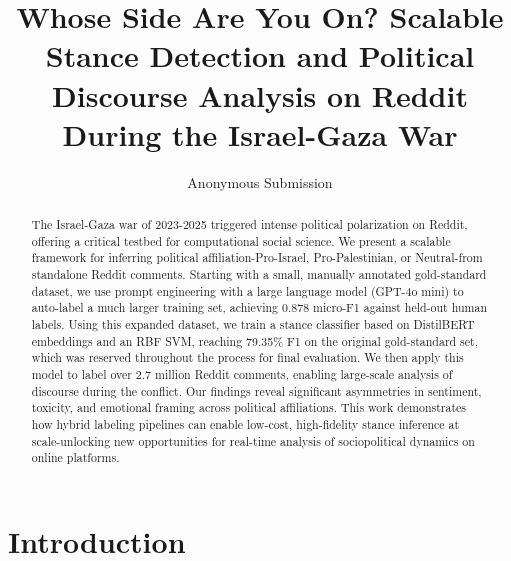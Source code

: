 \documentclass[letterpaper]{article} %
\title{Whose Side Are You On? Scalable Stance Detection and Political Discourse Analysis on Reddit During the Israel-Gaza War}
\author{
    Anonymous Submission
}
\begin{document}
\maketitle


\begin{abstract}
The Israel-Gaza war of 2023-2025 triggered intense political polarization on Reddit, offering a critical testbed for computational social science. We present a scalable framework for inferring political affiliation-Pro-Israel, Pro-Palestinian, or Neutral-from standalone Reddit comments. Starting with a small, manually annotated gold-standard dataset, we use prompt engineering with a large language model (GPT-4o mini) to auto-label a much larger training set, achieving 0.878 micro-F1 against held-out human labels. Using this expanded dataset, we train a stance classifier based on DistilBERT embeddings and an RBF SVM, reaching 79.35\% F1 on the original gold-standard set, which was reserved throughout the process for final evaluation. We then apply this model to label over 2.7 million Reddit comments, enabling large-scale analysis of discourse during the conflict. Our findings reveal significant asymmetries in sentiment, toxicity, and emotional framing across political affiliations. This work demonstrates how hybrid labeling pipelines can enable low-cost, high-fidelity stance inference at scale-unlocking new opportunities for real-time analysis of sociopolitical dynamics on online platforms.
\end{abstract}

%
\begin{links}
\end{links}

\section{Introduction}
\label{sec:introduction}
\end{document}
